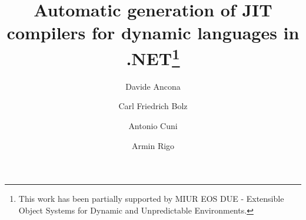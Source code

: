 \documentclass{llncs}
\begin{document}
\title{Automatic generation of JIT compilers for dynamic languages
  in .NET\thanks{This work has been partially
supported by MIUR EOS DUE - Extensible Object Systems for Dynamic and
Unpredictable Environments.}}


\author{Davide Ancona \and Carl Friedrich Bolz \and Antonio Cuni \and Armin Rigo}


\maketitle






%



\end{document}

